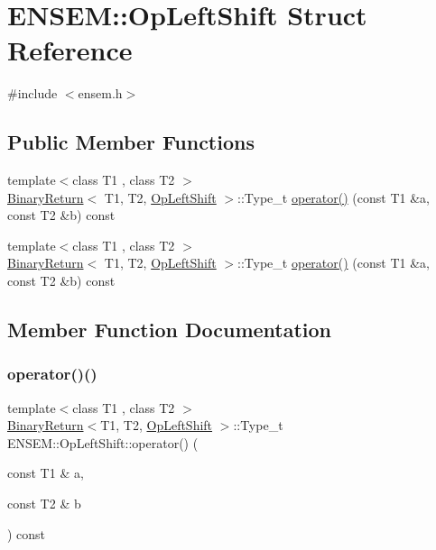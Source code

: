 \hypertarget{structENSEM_1_1OpLeftShift}{}\section{E\+N\+S\+EM\+:\+:Op\+Left\+Shift Struct Reference}
\label{structENSEM_1_1OpLeftShift}


{\ttfamily \#include $<$ensem.\+h$>$}

\subsection*{Public Member Functions}
\begin{DoxyCompactItemize}
\item 
{\footnotesize template$<$class T1 , class T2 $>$ }\\\mbox{\hyperlink{structENSEM_1_1BinaryReturn}{Binary\+Return}}$<$ T1, T2, \mbox{\hyperlink{structENSEM_1_1OpLeftShift}{Op\+Left\+Shift}} $>$\+::Type\+\_\+t \mbox{\hyperlink{structENSEM_1_1OpLeftShift_adf50631f48cb1f93f10fdb26256f19b6}{operator()}} (const T1 \&a, const T2 \&b) const
\item 
{\footnotesize template$<$class T1 , class T2 $>$ }\\\mbox{\hyperlink{structENSEM_1_1BinaryReturn}{Binary\+Return}}$<$ T1, T2, \mbox{\hyperlink{structENSEM_1_1OpLeftShift}{Op\+Left\+Shift}} $>$\+::Type\+\_\+t \mbox{\hyperlink{structENSEM_1_1OpLeftShift_adf50631f48cb1f93f10fdb26256f19b6}{operator()}} (const T1 \&a, const T2 \&b) const
\end{DoxyCompactItemize}


\subsection{Member Function Documentation}
\mbox{\label{structENSEM_1_1OpLeftShift_adf50631f48cb1f93f10fdb26256f19b6}} 
\subsubsection{\texorpdfstring{operator()()}{operator()()}\hspace{0.1cm}{\footnotesize\ttfamily [1/2]}}
{\footnotesize\ttfamily template$<$class T1 , class T2 $>$ \\
\mbox{\hyperlink{structENSEM_1_1BinaryReturn}{Binary\+Return}}$<$T1, T2, \mbox{\hyperlink{structENSEM_1_1OpLeftShift}{Op\+Left\+Shift}} $>$\+::Type\+\_\+t E\+N\+S\+E\+M\+::\+Op\+Left\+Shift\+::operator() (\begin{DoxyParamCaption}\item[{const T1 \&}]{a,  }\item[{const T2 \&}]{b }\end{DoxyParamCaption}) const\hspace{0.3cm}{\ttfamily [inline]}}


